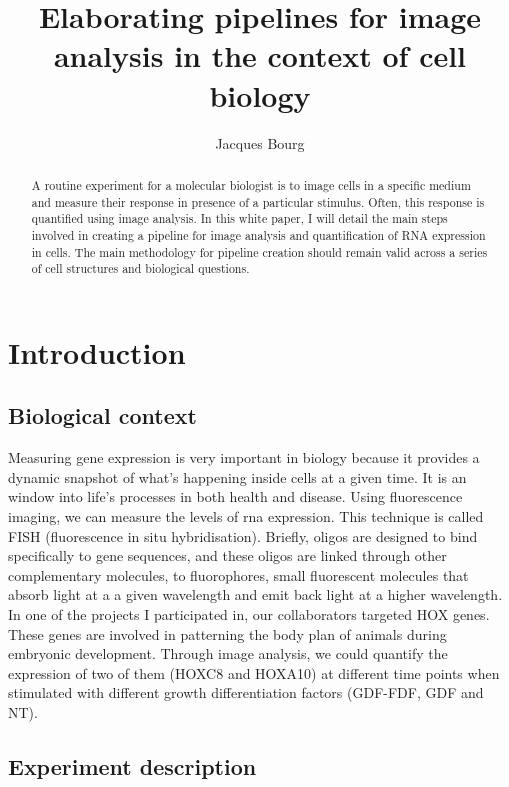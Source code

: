 \documentclass[24pt]{article}
\title{Elaborating pipelines for image analysis in the context of cell biology}
\author{Jacques Bourg}
\begin{document}
\maketitle

\begin{abstract}
  A routine experiment for a molecular biologist is to image cells in a specific medium and measure their response in presence of a particular stimulus. Often, this response is quantified using image analysis. 
In this white paper, I will detail the main steps involved in creating a pipeline for image analysis and quantification of RNA expression in cells. The main methodology for pipeline creation should remain valid across a series of cell structures and biological questions.
\end{abstract}


\section{Introduction}
 

\subsection{Biological context }

Measuring gene expression is very important in biology because it provides a dynamic snapshot of what's happening inside cells at a given time. It is an window into life's processes in both health and disease.
Using fluorescence imaging, we can measure the levels of rna expression. This technique is called FISH (fluorescence in situ hybridisation).  Briefly, oligos are designed to bind specifically to gene sequences, and these oligos are linked through other complementary molecules, to fluorophores, small fluorescent molecules that absorb light at a a given wavelength and emit back light at a higher wavelength. In one of the projects I participated in, our collaborators targeted HOX genes. These genes are involved in patterning the body plan of animals during embryonic development. Through image analysis, we could quantify the expression of two of them (HOXC8 and HOXA10) at different time points when stimulated with different growth differentiation factors (GDF-FDF, GDF and NT). 
 
\subsection{Experiment description} 
 
\end{document}
